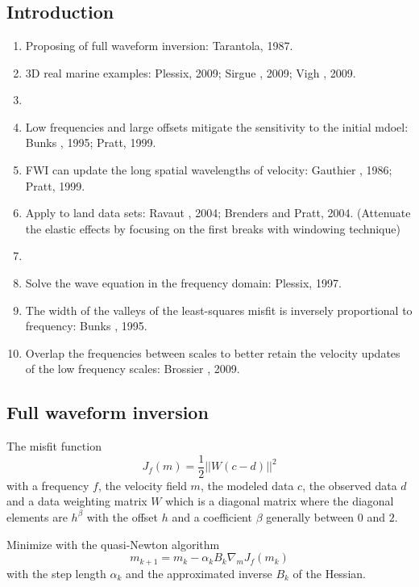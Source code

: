 \renewcommand{\pmk}{Plessix\_2010\_SEG\_Application to land data set}
\renewcommand{\prf}{FWI/\pmk.pdf}
\renewcommand{\pti}{Application of acoustic full waveform inversion to a low-frequency large-offset land data set}
\renewcommand{\pay}{Ren\'{e}-Edouard Plessix, Guido Baeten and Jan Willem de Maag \etal, 2010}
\renewcommand{\pjo}{SEG 2010 Annual Meeting}
\renewcommand{\pda}{2016/10/3 Mon.}
\section{\pinfo}
\subsection{Introduction}
\begin{enumerate}[\hspace{10mm}*]
  \item Proposing of full waveform inversion: Tarantola, 1987.
  \item 3D real marine examples: Plessix, 2009; Sirgue \etal, 2009; Vigh \etal, 2009.
  \item \sline
  \item Low frequencies and large offsets mitigate the sensitivity to the initial mdoel: Bunks \etal, 1995; Pratt, 1999.
  \item FWI can update the long spatial wavelengths of velocity: Gauthier \etal, 1986; Pratt, 1999.
  \item Apply to land data sets: Ravaut \etal, 2004; Brenders and Pratt, 2004. (Attenuate the elastic effects by focusing on the first breaks with windowing technique)
  \item \sline
  \item Solve the wave equation in the frequency domain: Plessix, 1997.
  \item The width of the valleys of the least-squares misfit is inversely proportional to frequency: Bunks \etal, 1995.
  \item Overlap the frequencies between scales to better retain the velocity updates of the low frequency scales: Brossier \etal, 2009.
\end{enumerate}\par
\subsection{Full waveform inversion}
The misfit function
\[ J_f(m)=\frac{1}{2}||W(c-d)||^2 \]
with a frequency $f$, the velocity field $m$, the modeled data $c$, the observed data $d$ and a data weighting matrix $W$ which is a diagonal matrix where the diagonal elements are $h^\beta$ with the offset $h$ and a coefficient $\beta$ generally between $0$ and $2$.\par
Minimize with the quasi-Newton algorithm
\[ m_{k+1}=m_k-\alpha_kB_k\nabla_mJ_f(m_k) \]
with the step length $\alpha_k$ and the approximated inverse $B_k$ of the Hessian.\par
